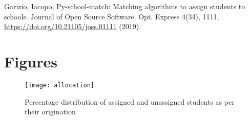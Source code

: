 \documentclass[twocolumn]{article}
\begin{document}
\begin{thebibliography}{1}

Garizio, Iacopo, 
  {Py-school-match: Matching algorithms to assign students to schools. Journal of Open Source Software.} Opt. Express {4(34)},
  1111, \url{https://doi.org/10.21105/joss.01111} (2019).
\end{thebibliography}
\onecolumn
\section*{Figures}

\begin{figure}[h!]
  \centering
  \texttt{[image: allocation]}
    \caption{Percentage distribution of assigned and unassigned students as per their origination}
    \label{fig:Assigned}
\end{figure}
\end{document}

